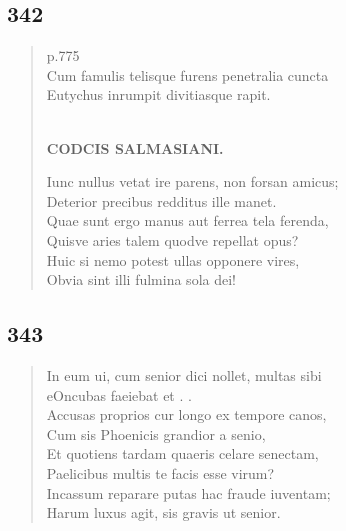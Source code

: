 \documentclass[11pt, a4paper]{report}
\begin{document}
            \subsection*{342}
      \begin{verse}
      p.775 \\ Cum famulis telisque furens penetralia cuncta \\ Eutychus inrumpit divitiasque rapit. \\ 
        ﻿\pagebreak 
    \begin{center} \textbf{CODCIS SALMASIANI.} \end{center} \marginpar{[0]}  \marginpar{[40]} Iunc nullus vetat ire parens, non forsan amicus; \\ Deterior precibus redditus ille manet. \\ Quae sunt ergo manus aut ferrea tela ferenda, \\ Quisve aries talem quodve repellat opus? \\ Huic si nemo potest ullas opponere vires, \\ Obvia sint illi fulmina sola dei! \\ 
      \end{verse}
  
            \subsection*{343}
      \begin{verse}
      In eum ui, cum senior dici nollet, multas sibi \\ eOncubas faeiebat et . . \\ Accusas proprios cur longo ex tempore canos, \\ Cum sis Phoenicis grandior a senio, \\ Et quotiens tardam quaeris celare senectam, \\ Paelicibus multis te facis esse virum? \\ Incassum reparare putas hac fraude iuventam; \\ Harum luxus agit, sis gravis ut senior. \\ 
      \end{verse}
  
\end{document}
